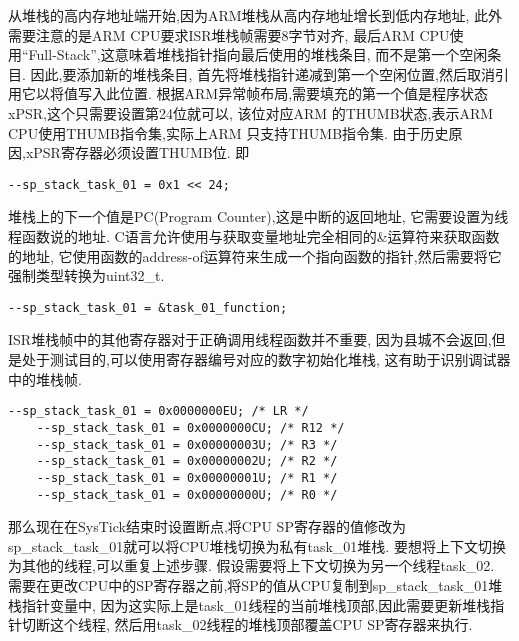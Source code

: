 从堆栈的高内存地址端开始,因为ARM堆栈从高内存地址增长到低内存地址,
此外需要注意的是ARM CPU要求ISR堆栈帧需要8字节对齐,
最后ARM CPU使用“Full-Stack”,这意味着堆栈指针指向最后使用的堆栈条目,
而不是第一个空闲条目.
因此,要添加新的堆栈条目,
首先将堆栈指针递减到第一个空闲位置,然后取消引用它以将值写入此位置.
根据ARM异常帧布局,需要填充的第一个值是程序状态xPSR,这个只需要设置第24位就可以,
该位对应ARM 的THUMB状态,表示ARM CPU使用THUMB指令集,实际上ARM 只支持THUMB指令集.
由于历史原因,xPSR寄存器必须设置THUMB位.
即
\begin{lstlisting}[language={[ANSI]C},keywordstyle=\color{blue!70},commentstyle=\color{red!50!green!50!blue!50},frame=shadowbox, rulesepcolor=\color{red!20!green!20!blue!20}]
--sp_stack_task_01 = 0x1 << 24;
\end{lstlisting}
堆栈上的下一个值是PC(Program Counter),这是中断的返回地址,
它需要设置为线程函数说的地址.
C语言允许使用与获取变量地址完全相同的\&运算符来获取函数的地址,
它使用函数的address-of运算符来生成一个指向函数的指针,然后需要将它强制类型转换为uint32\_t.
\begin{lstlisting}[language={[ANSI]C},keywordstyle=\color{blue!70},commentstyle=\color{red!50!green!50!blue!50},frame=shadowbox, rulesepcolor=\color{red!20!green!20!blue!20}]
    --sp_stack_task_01 = &task_01_function;
 \end{lstlisting}

 ISR堆栈帧中的其他寄存器对于正确调用线程函数并不重要,
 因为县城不会返回,但是处于测试目的,可以使用寄存器编号对应的数字初始化堆栈,
 这有助于识别调试器中的堆栈帧.
 \begin{lstlisting}[language={[ANSI]C},keywordstyle=\color{blue!70},commentstyle=\color{red!50!green!50!blue!50},frame=shadowbox, rulesepcolor=\color{red!20!green!20!blue!20}]
    --sp_stack_task_01 = 0x0000000EU; /* LR */
    --sp_stack_task_01 = 0x0000000CU; /* R12 */
    --sp_stack_task_01 = 0x00000003U; /* R3 */
    --sp_stack_task_01 = 0x00000002U; /* R2 */
    --sp_stack_task_01 = 0x00000001U; /* R1 */
    --sp_stack_task_01 = 0x00000000U; /* R0 */
 \end{lstlisting}

那么现在在SysTick结束时设置断点,将CPU SP寄存器的值修改为sp\_stack\_task\_01就可以将CPU堆栈切换为私有task\_01堆栈.
要想将上下文切换为其他的线程,可以重复上述步骤.
假设需要将上下文切换为另一个线程task\_02.
需要在更改CPU中的SP寄存器之前,将SP的值从CPU复制到sp\_stack\_task\_01堆栈指针变量中,
因为这实际上是task\_01线程的当前堆栈顶部,因此需要更新堆栈指针切断这个线程,
然后用task\_02线程的堆栈顶部覆盖CPU SP寄存器来执行.

